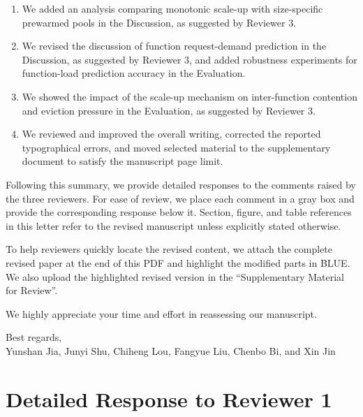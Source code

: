 \documentclass[11pt]{article}
\begin{document}
\begin{enumerate}[label=\arabic*.]
  \item We added an analysis comparing monotonic scale-up with size-specific prewarmed pools in the Discussion, as suggested by Reviewer 3.
  \item We revised the discussion of function request-demand prediction in the Discussion, as suggested by Reviewer 3, and added robustness experiments for function-load prediction accuracy in the Evaluation.
  \item We showed the impact of the scale-up mechanism on inter-function contention and eviction pressure in the Evaluation, as suggested by Reviewer 3.
  \item We reviewed and improved the overall writing, corrected the reported typographical errors, and moved selected material to the supplementary document to satisfy the manuscript page limit.
\end{enumerate}

Following this summary, we provide detailed responses to the comments raised by the three reviewers. For ease of review, we place each comment in a gray box and provide the corresponding response below it. Section, figure, and table references in this letter refer to the revised manuscript unless explicitly stated otherwise.

To help reviewers quickly locate the revised content, we attach the complete revised paper at the end of this PDF and highlight the modified parts in {\color{blue}BLUE}. We also upload the highlighted revised version in the “Supplementary Material for Review”.

We highly appreciate your time and effort in reassessing our manuscript.

Best regards,\\
Yunshan Jia, Junyi Shu, Chiheng Lou, Fangyue Liu, Chenbo Bi, and Xin Jin

\clearpage
\section*{Detailed Response to Reviewer 1}
\end{document}
